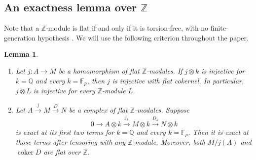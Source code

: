 \documentclass[twoside,a4paper,12pt,reqno]{amsart}
\newtheorem{lemma}[theorem]{Lemma}
\theoremstyle{remark}
\numberwithin{equation}{section}
\newcommand{\Z}{\mathbb Z}
\newcommand{\Q}{\mathbb Q}
\newcommand{\F}{\mathbb F}
\begin{document}
\subsection{An exactness lemma over \texorpdfstring{\(\Z\)}{Z}}

Note that a \(\Z\)-module is flat if and only if it is torsion-free, with no finite-generation hypothesis \cite[Tag 0AUW(1)]{Stacks}. We will use the following criterion throughout the paper.

\begin{lemma}\label{lem:flat}\leavevmode
\begin{enumerate}
\item\label{item:flat-injection}
Let \(j:A\to M\) be a homomorphism of flat \(\Z\)-modules. If \(j\otimes k\) is injective for \(k=\Q\) and every \(k=\F_p\), then \(j\) is injective with flat cokernel. In particular, \(j\otimes L\) is injective for every \(\Z\)-module \(L\).
\item\label{item:flat-complex}
Let \(A\xrightarrow{j}M\xrightarrow{D}N\) be a complex of flat \(\Z\)-modules. Suppose
\[
0\longrightarrow A\otimes k
\xrightarrow{j_k}M\otimes k
\xrightarrow{D_k}N\otimes k
\]
is exact at its first two terms for \(k=\Q\) and every \(k=\F_p\). Then it is exact at those terms after tensoring with any \(\Z\)-module. Moreover, both \(M/j(A)\) and \(\operatorname{coker}D\) are flat over \(\Z\).
\end{enumerate}
\end{lemma}
\end{document}
